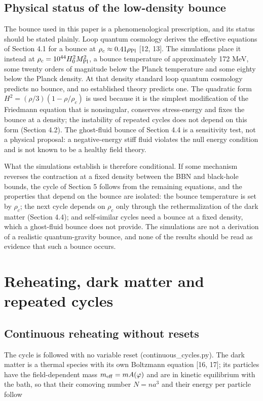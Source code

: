 \documentclass[pdflatex,sn-mathphys-num]{sn-jnl}
\begin{document}
\subsection{Physical status of the low-density bounce}
The bounce used in this paper is a phenomenological prescription, and its status should be stated plainly. Loop quantum cosmology derives the effective equations of Section 4.1 for a bounce at $\rho_c\approx0.41\rho_{\rm Pl}$ [12, 13]. The simulations place it instead at $\rho_c=10^{44}H_0^2M_{\rm Pl}^2$, a bounce temperature of approximately 172 MeV, some twenty orders of magnitude below the Planck temperature and some eighty below the Planck density. At that density standard loop quantum cosmology predicts no bounce, and no established theory predicts one. The quadratic form $H^2=(\rho/3)(1-\rho/\rho_c)$ is used because it is the simplest modification of the Friedmann equation that is nonsingular, conserves stress-energy and fixes the bounce at a density; the instability of repeated cycles does not depend on this form (Section 4.2). The ghost-fluid bounce of Section 4.4 is a sensitivity test, not a physical proposal: a negative-energy stiff fluid violates the null energy condition and is not known to be a healthy field theory.

What the simulations establish is therefore conditional. If some mechanism reverses the contraction at a fixed density between the BBN and black-hole bounds, the cycle of Section 5 follows from the remaining equations, and the properties that depend on the bounce are isolated: the bounce temperature is set by $\rho_c$; the next cycle depends on $\rho_c$ only through the rethermalization of the dark matter (Section 4.4); and self-similar cycles need a bounce at a fixed density, which a ghost-fluid bounce does not provide. The simulations are not a derivation of a realistic quantum-gravity bounce, and none of the results should be read as evidence that such a bounce occurs.

\section{Reheating, dark matter and repeated cycles}
\subsection{Continuous reheating without resets}
The cycle is followed with no variable reset (continuous\_cycles.py). The dark matter is a thermal species with its own Boltzmann equation [16, 17]; its particles have the field-dependent mass $m_{\rm eff}=mA(\varphi)$ and are in kinetic equilibrium with the bath, so that their comoving number $N=na^3$ and their energy per particle follow
\end{document}
